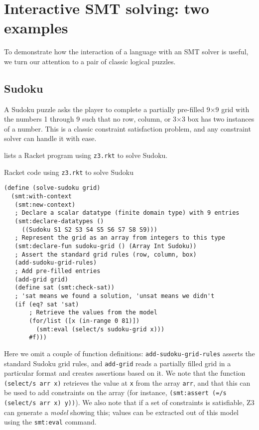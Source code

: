 \section{Interactive SMT solving: two examples}
\label{sec:interactive}

To demonstrate how the interaction of a language with an SMT solver is useful, we
turn our attention to a pair of classic logical puzzles.

\subsection{Sudoku}

A Sudoku puzzle asks the player to complete a partially pre-filled 9$\times$9
grid with the numbers 1 through 9 such that no row, column, or 3$\times$3 box
has two instances of a number. This is a classic constraint satisfaction
problem, and any constraint solver can handle it with ease.

 lists a Racket program using \texttt{z3.rkt} to solve Sudoku.

\begin{program}
\caption{Racket code using \texttt{z3.rkt} to solve Sudoku}
\label{fig:sudoku}
\begin{verbatim}
(define (solve-sudoku grid)
  (smt:with-context
   (smt:new-context)
   ; Declare a scalar datatype (finite domain type) with 9 entries
   (smt:declare-datatypes ()
     ((Sudoku S1 S2 S3 S4 S5 S6 S7 S8 S9)))
   ; Represent the grid as an array from integers to this type
   (smt:declare-fun sudoku-grid () (Array Int Sudoku))
   ; Assert the standard grid rules (row, column, box)
   (add-sudoku-grid-rules)
   ; Add pre-filled entries
   (add-grid grid)
   (define sat (smt:check-sat))
   ; 'sat means we found a solution, 'unsat means we didn't
   (if (eq? sat 'sat)
       ; Retrieve the values from the model
       (for/list ([x (in-range 0 81)])
         (smt:eval (select/s sudoku-grid x)))
       #f)))
\end{verbatim}
\end{program}

Here we omit a couple of function definitions: \texttt{add-sudoku-grid-rules}
asserts the standard Sudoku grid rules, and \texttt{add-grid} reads a
partially filled grid in a particular format and creates assertions based on
it. We note that the function \texttt{(select/s arr x)} retrieves the value at
\texttt{x} from the array \texttt{arr}, and that this can be used to add
constraints on the array (for instance, \texttt{(smt:assert (=/s (select/s arr
x) y))}). We also note that if a set of constraints is satisfiable, Z3 can
generate a \textit{model} showing this; values can be extracted out of this
model using the \texttt{smt:eval} command.

